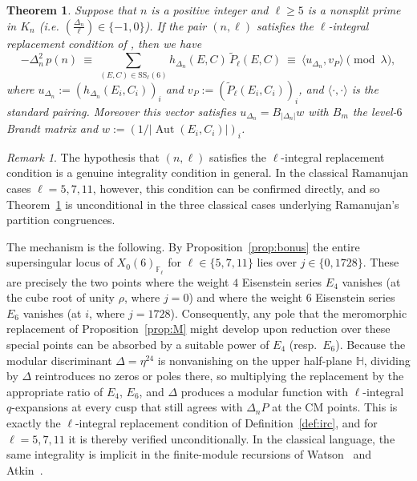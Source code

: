 \documentclass[12pt]{amsart}
\newtheorem{theorem}{Theorem}[section]
\theoremstyle{definition}
\theoremstyle{remark}
\newtheorem{remark}{Remark}
\newcommand{\ssloc}{\mathrm{SS}}
\newcommand{\Aut}{\operatorname{Aut}}
\begin{document}
\begin{theorem}\label{thm:ss-trace} Suppose that $n$ is a positive integer and $\ell\ge5$ is a nonsplit prime in $K_n$ (i.e.
$\left(\tfrac{\Delta_n}{\ell}\right)\in\{-1,0\}$). If the pair $(n,\ell)$
satisfies the $\ell$-integral replacement condition of , then we have
\begin{equation}\label{eq:ss-trace}
-\Delta_n^{2}\,p(n)\ \equiv\ \sum_{(E,C)\in\ssloc_\ell(6)}h_{\Delta_n}(E,C)\,\widetilde P_\ell(E,C)
\ \equiv\ \langle u_{\Delta_n},v_P\rangle\pmod\lambda,
\end{equation}
where $u_{\Delta_n}:=(h_{\Delta_n}(E_i,C_i))_i$ and $v_P:=(\widetilde P_\ell(E_i,C_i))_i$, and
$\langle\cdot,\cdot\rangle$ is the standard pairing. Moreover this vector satisfies $u_{\Delta_n}=B_{|\Delta_n|}w$
with $B_m$ the level-$6$ Brandt matrix and $w:=(1/|\Aut(E_i,C_i)|)_i$.
\end{theorem}

\begin{remark}
The hypothesis that $(n,\ell)$ satisfies the $\ell$-integral replacement
condition is a genuine integrality condition in general.  In the classical
Ramanujan cases $\ell=5,7,11$, however, this condition can be confirmed
directly, and so Theorem~\ref{thm:ss-trace} is unconditional in the three
classical cases underlying Ramanujan's partition congruences.

The mechanism is the following.  By Proposition~\ref{prop:bonus} the entire
supersingular locus of $X_0(6)_{\mathbb F_\ell}$ for $\ell\in\{5,7,11\}$ lies over
$j\in\{0,1728\}$.  These are precisely the two points where the weight $4$
Eisenstein series $E_4$ vanishes (at the cube root of unity $\rho$, where $j=0$)
and where the weight $6$ Eisenstein series $E_6$ vanishes (at $i$, where
$j=1728$).  Consequently, any pole that the meromorphic replacement of
Proposition~\ref{prop:M} might develop upon reduction over these special points
can be absorbed by a suitable power of $E_4$ (resp.\ $E_6$).  Because the
modular discriminant $\Delta=\eta^{24}$ is nonvanishing on the upper half-plane
$\mathbb H$, dividing by $\Delta$ reintroduces no zeros or poles there, so
multiplying the replacement by the appropriate ratio of $E_4$, $E_6$, and
$\Delta$ produces a modular function with $\ell$-integral $q$-expansions at every
cusp that still agrees with $\Delta_n P$ at the CM points.  This is exactly the
$\ell$-integral replacement condition of Definition~\ref{def:irc}, and for
$\ell=5,7,11$ it is thereby verified unconditionally.  In the classical
language, the same integrality is implicit in the finite-module recursions of
Watson~\cite{Watson1938} and Atkin~\cite{Atkin}.
\end{remark}
\end{document}
